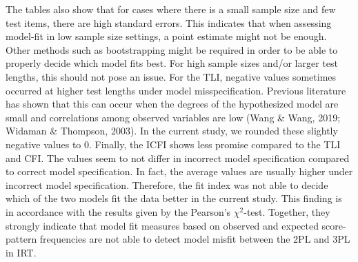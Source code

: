 \documentclass[Royal,sageapa,times,doublespace]{sagej}
\begin{document}
\indent The tables also show that for cases where there is a small sample size and few test items, there are high standard errors. This indicates that when assessing model-fit in low sample size settings, a point estimate might not be enough. Other methods such as bootstrapping might be required in order to be able to properly decide which model fits best. For high sample sizes and/or larger test lengths, this should not pose an issue. For the TLI, negative values sometimes occurred at higher test lengths under model misspecification. Previous literature has shown that this can occur when the degrees of the hypothesized model are small and correlations among observed variables are low (Wang \& Wang, 2019; Widaman \& Thompson, 2003). In the current study, we rounded these slightly negative values to 0. 
\newpage
\indent Finally, the ICFI shows less promise compared to the TLI and CFI. The values seem to not differ in incorrect model specification compared to correct model specification. In fact, the average values are usually higher under incorrect model specification. Therefore, the fit index was not able to decide which of the two models fit the data better in the current study. This finding is in accordance with the results given by the Pearson's $\chi^2$-test. Together, they strongly indicate that model fit measures based on observed and expected score-pattern frequencies are not able to detect model misfit between the 2PL and 3PL in IRT. \\
\end{document}

